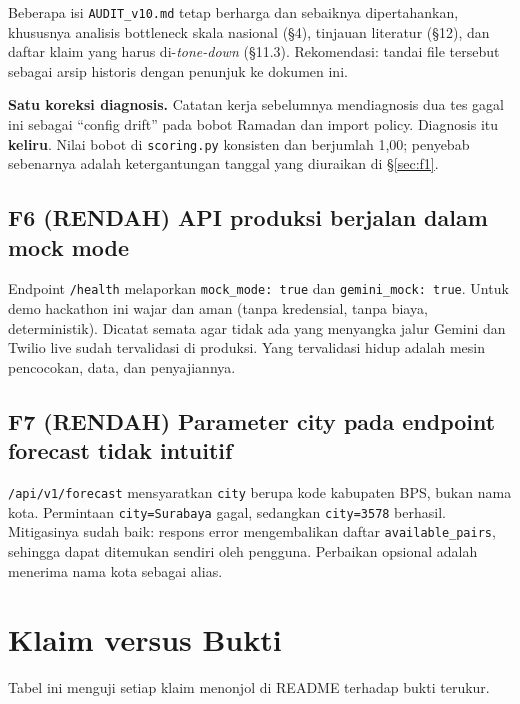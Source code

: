 \documentclass[11pt,a4paper]{article}
\newcommand{\code}[1]{\texttt{\small #1}}
\newcommand{\sevL}{\textcolor{sevlow}{\textbf{RENDAH}}}
\begin{document}
\noindent
Beberapa isi \code{AUDIT\_v10.md} tetap berharga dan sebaiknya dipertahankan, khususnya analisis
bottleneck skala nasional (\S4), tinjauan literatur (\S12), dan daftar klaim yang harus
di-\emph{tone-down} (\S11.3). Rekomendasi: tandai file tersebut sebagai arsip historis dengan
penunjuk ke dokumen ini.

\noindent
\textbf{Satu koreksi diagnosis.} Catatan kerja sebelumnya mendiagnosis dua tes gagal ini sebagai
``config drift'' pada bobot Ramadan dan import policy. Diagnosis itu \textbf{keliru}. Nilai bobot
di \code{scoring.py} konsisten dan berjumlah 1,00; penyebab sebenarnya adalah ketergantungan
tanggal yang diuraikan di \S\ref{sec:f1}.

\subsection{F6 (\sevL) API produksi berjalan dalam mock mode}
\label{sec:f6}

Endpoint \code{/health} melaporkan \code{mock\_mode: true} dan \code{gemini\_mock: true}. Untuk
demo hackathon ini wajar dan aman (tanpa kredensial, tanpa biaya, deterministik). Dicatat semata
agar tidak ada yang menyangka jalur Gemini dan Twilio live sudah tervalidasi di produksi. Yang
tervalidasi hidup adalah mesin pencocokan, data, dan penyajiannya.

\subsection{F7 (\sevL) Parameter city pada endpoint forecast tidak intuitif}
\label{sec:f7}

\code{/api/v1/forecast} mensyaratkan \code{city} berupa kode kabupaten BPS, bukan nama kota.
Permintaan \code{city=Surabaya} gagal, sedangkan \code{city=3578} berhasil. Mitigasinya sudah
baik: respons error mengembalikan daftar \code{available\_pairs}, sehingga dapat ditemukan sendiri
oleh pengguna. Perbaikan opsional adalah menerima nama kota sebagai alias.

\section{Klaim versus Bukti}
\label{sec:klaim}

Tabel ini menguji setiap klaim menonjol di README terhadap bukti terukur.
\end{document}

